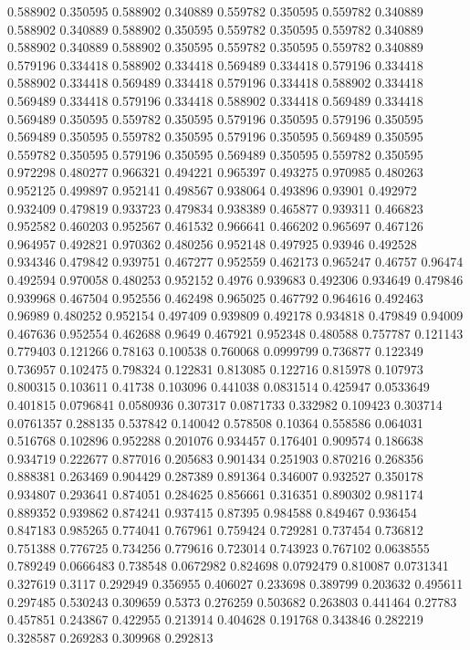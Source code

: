 0.588902 0.350595
0.588902 0.340889
0.559782 0.350595
0.559782 0.340889
0.588902 0.340889
0.588902 0.350595
0.559782 0.350595
0.559782 0.340889
0.588902 0.340889
0.588902 0.350595
0.559782 0.350595
0.559782 0.340889
0.579196 0.334418
0.588902 0.334418
0.569489 0.334418
0.579196 0.334418
0.588902 0.334418
0.569489 0.334418
0.579196 0.334418
0.588902 0.334418
0.569489 0.334418
0.579196 0.334418
0.588902 0.334418
0.569489 0.334418
0.569489 0.350595
0.559782 0.350595
0.579196 0.350595
0.579196 0.350595
0.569489 0.350595
0.559782 0.350595
0.579196 0.350595
0.569489 0.350595
0.559782 0.350595
0.579196 0.350595
0.569489 0.350595
0.559782 0.350595
0.972298 0.480277
0.966321 0.494221
0.965397 0.493275
0.970985 0.480263
0.952125 0.499897
0.952141 0.498567
0.938064 0.493896
0.93901 0.492972
0.932409 0.479819
0.933723 0.479834
0.938389 0.465877
0.939311 0.466823
0.952582 0.460203
0.952567 0.461532
0.966641 0.466202
0.965697 0.467126
0.964957 0.492821
0.970362 0.480256
0.952148 0.497925
0.93946 0.492528
0.934346 0.479842
0.939751 0.467277
0.952559 0.462173
0.965247 0.46757
0.96474 0.492594
0.970058 0.480253
0.952152 0.4976
0.939683 0.492306
0.934649 0.479846
0.939968 0.467504
0.952556 0.462498
0.965025 0.467792
0.964616 0.492463
0.96989 0.480252
0.952154 0.497409
0.939809 0.492178
0.934818 0.479849
0.94009 0.467636
0.952554 0.462688
0.9649 0.467921
0.952348 0.480588
0.757787 0.121143
0.779403 0.121266
0.78163 0.100538
0.760068 0.0999799
0.736877 0.122349
0.736957 0.102475
0.798324 0.122831
0.813085 0.122716
0.815978 0.107973
0.800315 0.103611
0.41738 0.103096
0.441038 0.0831514
0.425947 0.0533649
0.401815 0.0796841
0.0580936 0.307317
0.0871733 0.332982
0.109423 0.303714
0.0761357 0.288135
0.537842 0.140042
0.578508 0.10364
0.558586 0.064031
0.516768 0.102896
0.952288 0.201076
0.934457 0.176401
0.909574 0.186638
0.934719 0.222677
0.877016 0.205683
0.901434 0.251903
0.870216 0.268356
0.888381 0.263469
0.904429 0.287389
0.891364 0.346007
0.932527 0.350178
0.934807 0.293641
0.874051 0.284625
0.856661 0.316351
0.890302 0.981174
0.889352 0.939862
0.874241 0.937415
0.87395 0.984588
0.849467 0.936454
0.847183 0.985265
0.774041 0.767961
0.759424 0.729281
0.737454 0.736812
0.751388 0.776725
0.734256 0.779616
0.723014 0.743923
0.767102 0.0638555
0.789249 0.0666483
0.738548 0.0672982
0.824698 0.0792479
0.810087 0.0731341
0.327619 0.3117
0.292949 0.356955
0.406027 0.233698
0.389799 0.203632
0.495611 0.297485
0.530243 0.309659
0.5373 0.276259
0.503682 0.263803
0.441464 0.27783
0.457851 0.243867
0.422955 0.213914
0.404628 0.191768
0.343846 0.282219
0.328587 0.269283
0.309968 0.292813
